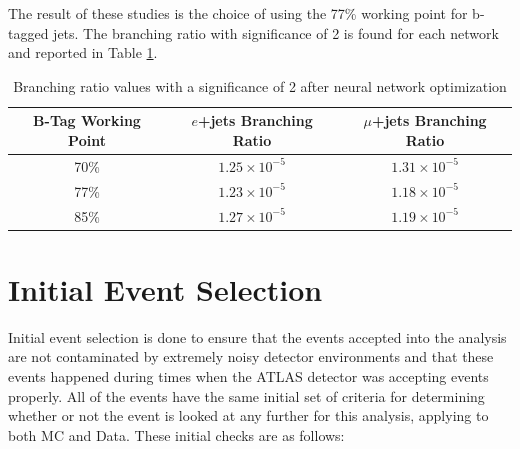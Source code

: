 The result of these studies is the choice of using the 77\% working point for b-tagged jets.  The branching ratio with significance of 2 is found for each network and reported in Table \ref{tab:BRsAfterNN}.

\begin{table}[]
\begin{center}
{\renewcommand{\arraystretch}{1.2}
\begin{tabular}{ccc}
\hline
B-Tag Working Point  &  $e$+jets Branching Ratio   & $\mu$+jets Branching Ratio  \\  \hline 
70\%            &  $1.25\times10^{-5}$  &  $1.31\times10^{-5}$\\
77\%           &   $1.23\times10^{-5}$ &   $1.18\times10^{-5}$	\\  
85\%            &  $1.27\times10^{-5}$ &   $1.19\times10^{-5}$	\\ \hline
\end{tabular}
\caption{Branching ratio values with a significance of 2 after neural network optimization}
\label{tab:BRsAfterNN}
}
\end{center}
\end{table}





\section{Initial Event Selection}
\label{sec:InitSelec}
Initial event selection is done to ensure that the events accepted into the analysis are not contaminated by extremely noisy detector environments and that these events happened during times when the ATLAS detector was accepting events properly.  All of the events  have the same initial set of criteria for determining whether or not the event is looked at any further for this analysis, applying to both MC and Data.  These initial checks are as follows:

